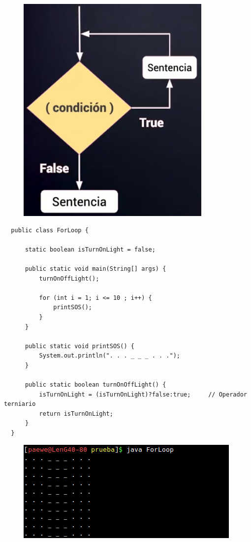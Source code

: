 \documentclass{article}
\begin{document}
\begin{figure}[h!]
  \centering
  \includegraphics[scale=0.75]{./Pictures/029_for.png}
\end{figure}

\begin{verbatim}
  public class ForLoop {

      static boolean isTurnOnLight = false;

      public static void main(String[] args) {
          turnOnOffLight();

          for (int i = 1; i <= 10 ; i++) {
              printSOS();
          }
      }

      public static void printSOS() {
          System.out.println(". . . _ _ _ . . .");
      }

      public static boolean turnOnOffLight() {
          isTurnOnLight = (isTurnOnLight)?false:true;     // Operador terniario
          return isTurnOnLight;
      }
  }
\end{verbatim}

\newpage

\begin{figure}[h!]
  \centering
  \includegraphics[scale=0.75]{./Pictures/056_forloop.png}
\end{figure}
\end{document}
